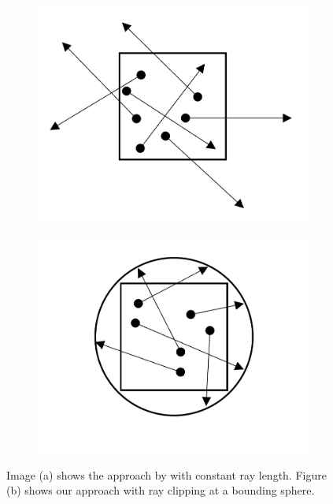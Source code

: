 \begin{figure}[t]
    \centering
    \begin{subfigure}[b]{0.25\linewidth}
        \centering
        \includegraphics[width=\linewidth]{img/raygen_filtering_unclipped.png}
        \caption{}
        \label{fig:raygen_filtering_unclipped}
    \end{subfigure}
    \begin{subfigure}[b]{0.25\linewidth}
        \centering
        \includegraphics[width=1\linewidth]{img/raygen_filtering_clipped.png}
        \caption{}
        \label{fig:raygen_filtering_clipped}
    \end{subfigure}
	\caption[Approaches for determining a ray length for filtering]{Image (a) shows the approach by \citeauthor{hybrid_mesh_volume_lods} \cite{hybrid_mesh_volume_lods} with constant ray length. Figure (b) shows our approach with ray clipping at a bounding sphere.}
	\label{fig:raygen_filtering}
\end{figure}

